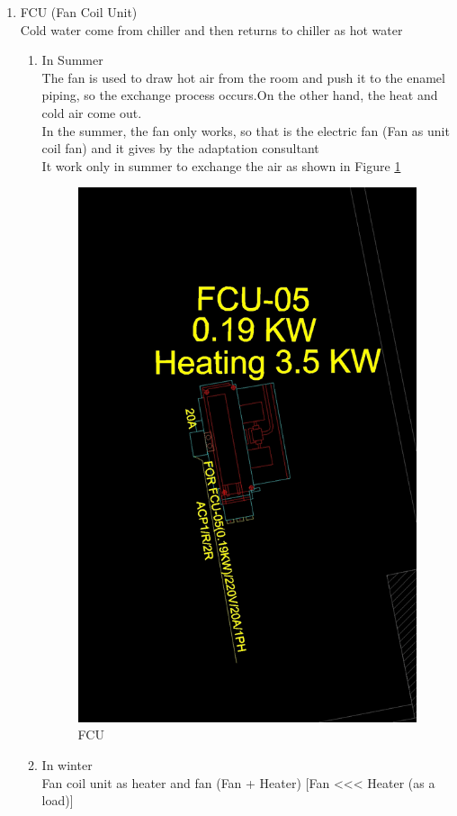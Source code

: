 \documentclass[12pt,fleqn]{book} %
\begin{document}
\begin{enumerate}
    \item FCU (Fan Coil Unit)
    \\ Cold water come from chiller and then returns to chiller as hot water 
    \begin{enumerate}
        \item  In Summer
        \\The fan is used to draw hot air from the room and push it to the enamel piping, so the exchange process occurs.On the other hand, the heat and cold air come out.
        \\ In the summer, the fan only works, so that is the electric fan (Fan as unit coil fan) and it gives by the adaptation consultant
        \\It work only in summer to exchange the air as shown in  Figure \ref{fig:h 5}
        \begin{figure}[h!]
    \centering
    \includegraphics[width=0.5\linewidth]{h 5.png}
    \caption{ FCU  }
    \label{fig:h 5}
\end{figure} 
        
        \item 	In winter
        \\ Fan coil unit as heater and fan (Fan + Heater) [Fan <<< Heater (as a load)]
    \end{enumerate}
  

\end{enumerate}
\end{document}
